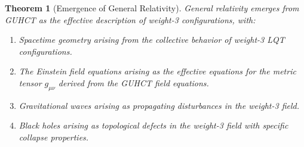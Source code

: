 \documentclass[11pt,a4paper]{article}
\newtheorem{theorem}{Theorem}[section]
\begin{document}
\begin{theorem}[Emergence of General Relativity]
\label{thm:gr_emergence_axioms_thm} %
General relativity emerges from GUHCT as the effective description of weight-3 configurations, with:
\begin{enumerate}
    \item Spacetime geometry arising from the collective behavior of weight-3 LQT configurations.
    \item The Einstein field equations arising as the effective equations for the metric tensor $g_{\mu\nu}$ derived from the GUHCT field equations.
    \item Gravitational waves arising as propagating disturbances in the weight-3 field.
    \item Black holes arising as topological defects in the weight-3 field with specific collapse properties.
\end{enumerate}
\end{theorem}
\end{document}
